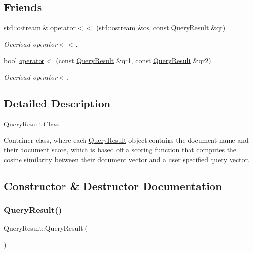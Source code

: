 \subsection*{Friends}
\begin{DoxyCompactItemize}
\item 
std\+::ostream \& \hyperlink{class_query_result_a860145488e9a3cd6c7df13816dd3f78e}{operator$<$$<$} (std\+::ostream \&os, const \hyperlink{class_query_result}{Query\+Result} \&qr)
\begin{DoxyCompactList}\small\item\em Overload operator$<$$<$. \end{DoxyCompactList}\item 
bool \hyperlink{class_query_result_a818370d36ae89f51264a7701543884bd}{operator$<$} (const \hyperlink{class_query_result}{Query\+Result} \&qr1, const \hyperlink{class_query_result}{Query\+Result} \&qr2)
\begin{DoxyCompactList}\small\item\em Overload operator$<$. \end{DoxyCompactList}\end{DoxyCompactItemize}


\subsection{Detailed Description}
\hyperlink{class_query_result}{Query\+Result} Class. 

Container class, where each \hyperlink{class_query_result}{Query\+Result} object contains the document name and their document score, which is based off a scoring function that computes the cosine similarity between their document vector and a user specified query vector. 

\subsection{Constructor \& Destructor Documentation}
\mbox{\label{class_query_result_a23c0f8433d60025e81759f569dc08ab8}} 
\subsubsection{\texorpdfstring{Query\+Result()}{QueryResult()}\hspace{0.1cm}{\footnotesize\ttfamily [1/3]}}
{\footnotesize\ttfamily Query\+Result\+::\+Query\+Result (\begin{DoxyParamCaption}{ }\end{DoxyParamCaption})\hspace{0.3cm}{\ttfamily [inline]}}



